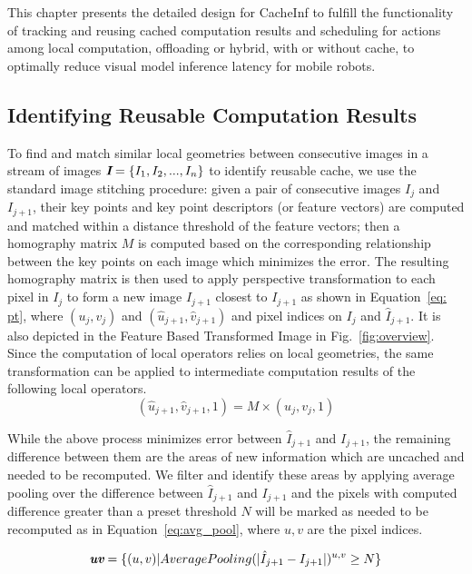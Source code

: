 This chapter presents the detailed design for CacheInf to fulfill the functionality of tracking and reusing cached computation results and scheduling for actions among local computation, offloading or hybrid, with or without cache, to optimally reduce visual model inference latency for mobile robots.

\subsection{Identifying Reusable Computation Results\label{sec:reusable cache}}
To find and match similar local geometries between consecutive images in a stream of images $\textit{\textbf{I}}=\{I_1, I_2, ..., I_n\}$ to identify reusable cache, we use the standard image stitching procedure: given a pair of consecutive images $I_j$ and $I_{j+1}$, their key points and key point descriptors (or feature vectors) are computed and matched within a distance threshold of the feature vectors; then a homography matrix $M$ is computed based on the corresponding relationship between the key points on each image which minimizes the error.
The resulting homography matrix is then used to apply perspective transformation to each pixel in $I_j$ to form a new image $\hat{I}_{j+1}$ closest to $I_{j+1}$ as shown in Equation~\ref{eq: pt}, where $(u_j,v_j)$ and $(\hat{u}_{j+1},\hat{v}_{j+1})$ and pixel indices on $I_j$ and $\hat{I}_{j+1}$.
It is also depicted in the Feature Based Transformed Image in Fig.~\ref{fig:overview}.
Since the computation of local operators relies on local geometries, the same transformation can be applied to intermediate computation results of the following local operators.
\begin{equation}
    (\hat{u}_{j+1},\hat{v}_{j+1},1) = M \times (u_j,v_j,1)
    \label{eq: pt}
\end{equation}

While the above process minimizes error between $\hat{I}_{j+1}$ and $I_{j+1}$, the remaining difference between them are the areas of new information which are uncached and needed to be recomputed.
We filter and identify these areas by applying average pooling over the difference between $\hat{I}_{j+1}$ and $I_{j+1}$ and the pixels with computed difference greater than a preset threshold $N$ will be marked as needed to be recomputed as in Equation~\ref{eq:avg_pool}, where $u,v$ are the pixel indices.

\begin{equation}
    \textit{\textbf{uv}} = \{(u,v)|AveragePooling(|\hat{I}_{j+1} - I_{j+1}|)^{u,v} \geq N\}
    \label{eq:avg_pool}
\end{equation}

